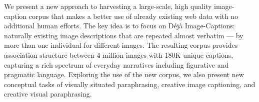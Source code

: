 We present a new approach to harvesting a large-scale, high quality image-caption corpus that makes a better use of already existing web data with no additional human efforts. The key idea is to focus on Déjà Image-Captions: naturally existing image descriptions that are repeated almost verbatim --- by more than one individual for different images. The resulting corpus provides association structure between 4 million images with 180K unique captions, capturing a rich spectrum of everyday narratives including figurative and pragmatic language. Exploring the use of the new corpus, we also present new conceptual tasks of visually situated paraphrasing, creative image captioning, and creative visual paraphrasing.
